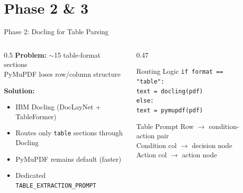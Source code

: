\documentclass[aspectratio=169, 12pt]{beamer}
\begin{document}
\section{Phase 2 \& 3}

\begin{frame}{Phase 2: Docling for Table Parsing}
\begin{columns}
\begin{column}{0.5\textwidth}
\textbf{Problem:} $\sim$15 table-format sections \\[0.3em]
PyMuPDF loses row/column structure

\vspace{0.5cm}
\textbf{Solution:}
\begin{itemize}
    \item IBM Docling (DocLayNet + TableFormer)
    \item Routes only \texttt{table} sections through Docling
    \item PyMuPDF remains default (faster)
    \item Dedicated \texttt{TABLE\_EXTRACTION\_PROMPT}
\end{itemize}
\end{column}
\begin{column}{0.47\textwidth}
\begin{block}{Routing Logic}
\small
\texttt{if format == "table":}\\
\quad \texttt{text = docling(pdf)}\\
\texttt{else:}\\
\quad \texttt{text = pymupdf(pdf)}
\end{block}
\vspace{0.3cm}
\begin{block}{Table Prompt}
\small
Row $\rightarrow$ condition-action pair\\
Condition col $\rightarrow$ decision node\\
Action col $\rightarrow$ action node
\end{block}
\end{column}
\end{columns}
\end{frame}
\end{document}
